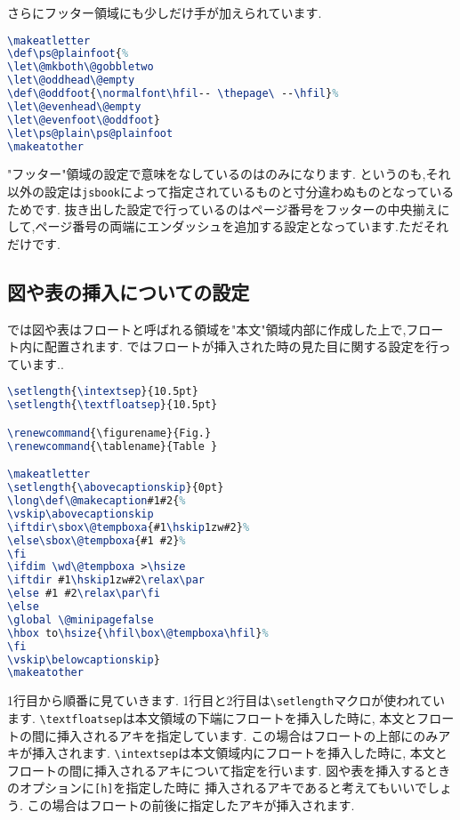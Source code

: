 さらにフッター領域にも少しだけ手が加えられています.
\begin{lstlisting}[caption = "フッター"領域の設定, label = list:footer, language=tex]
\makeatletter
\def\ps@plainfoot{%
\let\@mkboth\@gobbletwo
\let\@oddhead\@empty
\def\@oddfoot{\normalfont\hfil-- \thepage\ --\hfil}%
\let\@evenhead\@empty
\let\@evenfoot\@oddfoot}
\let\ps@plain\ps@plainfoot
\makeatother
\end{lstlisting}
"フッター"領域の設定で意味をなしているのは\texttt{\def\@oddfoot{\normalfont\hfil-- \thepage\ --\hfil}}のみになります.
というのも,それ以外の設定は\texttt{jsbook}によって指定されているものと寸分違わぬものとなっているためです.
抜き出した設定で行っているのはページ番号をフッターの中央揃えにして,ページ番号の両端にエンダッシュを追加する設定となっています.ただそれだけです.

\subsection{図や表の挿入についての設定}

{\pLaTeX}では図や表はフロートと呼ばれる領域を"本文"領域内部に作成した上で,フロート内に配置されます.
ではフロートが挿入された時の見た目に関する設定を行っています..
\begin{lstlisting}[caption = フロートついての設定, label = list:float, language = tex]
\setlength{\intextsep}{10.5pt}
\setlength{\textfloatsep}{10.5pt}

\renewcommand{\figurename}{Fig.}
\renewcommand{\tablename}{Table }

\makeatletter
\setlength{\abovecaptionskip}{0pt}
\long\def\@makecaption#1#2{%
\vskip\abovecaptionskip
\iftdir\sbox\@tempboxa{#1\hskip1zw#2}%
\else\sbox\@tempboxa{#1 #2}%
\fi
\ifdim \wd\@tempboxa >\hsize
\iftdir #1\hskip1zw#2\relax\par
\else #1 #2\relax\par\fi
\else
\global \@minipagefalse
\hbox to\hsize{\hfil\box\@tempboxa\hfil}%
\fi
\vskip\belowcaptionskip}
\makeatother
\end{lstlisting}

1行目から順番に見ていきます.
1行目と2行目は\verb|\setlength|マクロが使われています.
\verb|\textfloatsep|は本文領域の下端にフロートを挿入した時に,
本文とフロートの間に挿入されるアキを指定しています.
この場合はフロートの上部にのみアキが挿入されます.
\verb|\intextsep|は本文領域内にフロートを挿入した時に,
本文とフロートの間に挿入されるアキについて指定を行います.
図や表を挿入するときのオプションに\texttt{[h]}を指定した時に
挿入されるアキであると考えてもいいでしょう.
この場合はフロートの前後に指定したアキが挿入されます.

